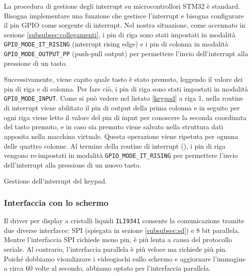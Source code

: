 \documentclass[a4paper]{article}
\begin{document}
La procedura di gestione degli interrupt su microcontrollori STM32 è standard. Bisogna implementare
una funzione che gestisce l'interrupt e bisogna configurare il pin GPIO come sorgente di interrupt.
Nel nostra situazione, come accennato in sezione \ref{subsubsec:collegamenti}, i pin di riga sono
stati impostati in modalità \texttt{GPIO\_MODE\_IT\_RISING} (interrupt rising edge) e i pin di
colonna in modalità \texttt{GPIO\_MODE\_OUTPUT\_PP} (push-pull output) per permettere l'invio
dell'interrupt alla pressione di un tasto.

Successivamente, viene capito quale tasto è stato premuto, leggendo il valore dei pin
di riga e di colonna. Per fare ciò, i pin di riga sono stati impostati in modalità
\texttt{GPIO\_MODE\_INPUT}. Come si può vedere nel listato \ref{keypad} a riga 1,
nella routine di interrupt viene abilitato il pin di output della prima colonna e in seguito
per ogni riga viene letto il valore del pin di input per conoscere la seconda coordinata
del tasto premuto, e in caso sia premuto viene salvato nella struttura dati apposita
nella macchina virtuale. Questa operazione viene ripetuta per ognuna delle quattro colonne.
Al termine della routine di interrupt
({}),
i pin di riga vengono re-impostati in modalità \texttt{GPIO\_MODE\_IT\_RISING} per permettere
l'invio dell'interrupt alla pressione di un nuovo tasto.

\begin{Listing}[h!t] %
    \centering
    \caption{Gestione dell'interrupt del keypad.}
    \label{keypad}
\end{Listing}

\subsubsection{Interfaccia con lo schermo}

Il driver per display a cristalli liquidi \texttt{ILI9341} consente la comunicazione tramite due
diverse interfacce: SPI (spiegata in sezione \ref{subsubsec:sd}) e 8 bit parallela. Mentre
l'interfaccia SPI richiede meno pin, è più lenta a causa del protocollo seriale. Al contrario,
l'interfaccia parallela è più veloce ma richiede più pin. Poiché dobbiamo visualizzare
i videogiochi sullo schermo e aggiornare l'immagine a circa 60 volte al secondo, abbiamo
optato per l'interfaccia parallela.
\end{document}
